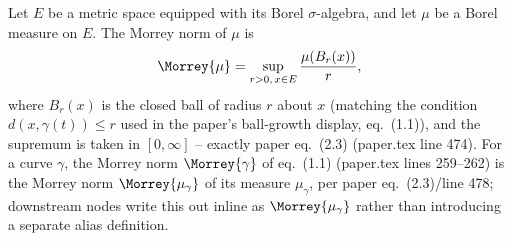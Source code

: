 \begin{definition}
  Let $E$ be a metric space equipped with its Borel $\sigma$-algebra, and let $\mu$ be a Borel
  measure on $E$. The Morrey norm of $\mu$ is
  \[
    \Morrey{\mu} = \sup_{r>0,\, x \in E} \frac{\mu(B_r(x))}{r}
    ,
  \]
  where $B_r(x)$ is the closed ball of radius $r$ about $x$ (matching the condition
  $d(x,\gamma(t)) \le r$ used in the paper's ball-growth display, eq.~(1.1)), and the supremum is
  taken in $[0,\infty]$ -- exactly paper eq.~(2.3) (paper.tex line 474). For a curve $\gamma$, the
  Morrey norm $\Morrey{\gamma}$ of eq.~(1.1) (paper.tex lines 259--262) is the Morrey norm
  $\Morrey{\mu_\gamma}$ of its measure $\mu_\gamma$, per paper eq.~(2.3)/line 478; downstream nodes
  write this out inline as $\Morrey{\mu_\gamma}$ rather than introducing a separate alias
  definition.
\end{definition}
